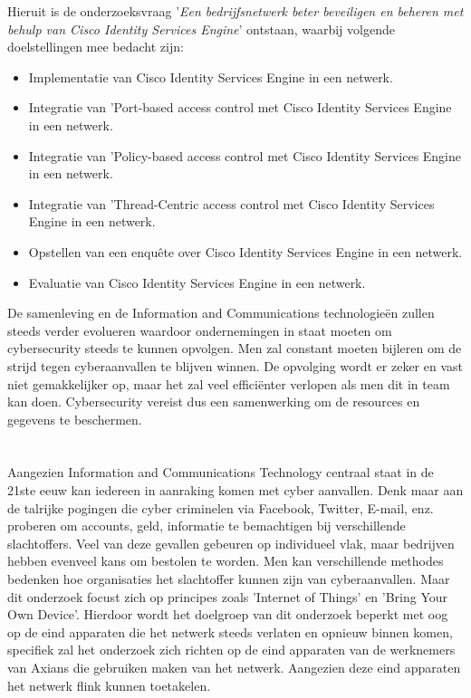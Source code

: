\newline
\newline
Hieruit is de onderzoeksvraag '\textit{Een bedrijfsnetwerk beter beveiligen en beheren met behulp van Cisco Identity Services Engine}' ontstaan, waarbij volgende doelstellingen mee bedacht zijn: 

\begin{itemize}
	\item Implementatie van Cisco Identity Services Engine in een netwerk.
	\item Integratie van 'Port-based access control met Cisco Identity Services Engine in een netwerk.
	\item Integratie van 'Policy-based access control met Cisco Identity Services Engine in een netwerk.
	\item Integratie van 'Thread-Centric access control met Cisco Identity Services Engine in een netwerk.
	\item Opstellen van een enquête over Cisco Identity Services Engine in een netwerk.
	\item Evaluatie van Cisco Identity Services Engine in een netwerk.
\end{itemize}

De samenleving en de Information and Communications technologieën zullen steeds verder evolueren waardoor ondernemingen in staat moeten om cybersecurity steeds te kunnen opvolgen. Men zal constant moeten bijleren om de strijd tegen cyberaanvallen te blijven winnen. De opvolging wordt er zeker en vast niet gemakkelijker op, maar het zal veel efficiënter verlopen als men dit in team kan doen. Cybersecurity vereist dus een samenwerking om de resources en gegevens te beschermen.

\section{}
\label{sec:probleemstelling}
Aangezien Information and Communications Technology centraal staat in de 21ste eeuw kan iedereen in aanraking komen met cyber aanvallen. Denk maar aan de talrijke pogingen die cyber criminelen via Facebook, Twitter, E-mail, enz. proberen om accounts, geld, informatie te bemachtigen bij verschillende slachtoffers. Veel van deze gevallen gebeuren op individueel vlak, maar bedrijven hebben evenveel kans om bestolen te worden. Men kan verschillende methodes bedenken hoe organisaties het slachtoffer kunnen zijn van cyberaanvallen. Maar dit onderzoek focust zich op principes zoals 'Internet of Things' en 'Bring Your Own Device'.
\newline
\newline
Hierdoor wordt het doelgroep van dit onderzoek beperkt met oog op de eind apparaten die het netwerk steeds verlaten en opnieuw binnen komen, specifiek zal het onderzoek zich richten op de eind apparaten van de werknemers van Axians die gebruiken maken van het netwerk. Aangezien deze eind apparaten het netwerk flink kunnen toetakelen.


